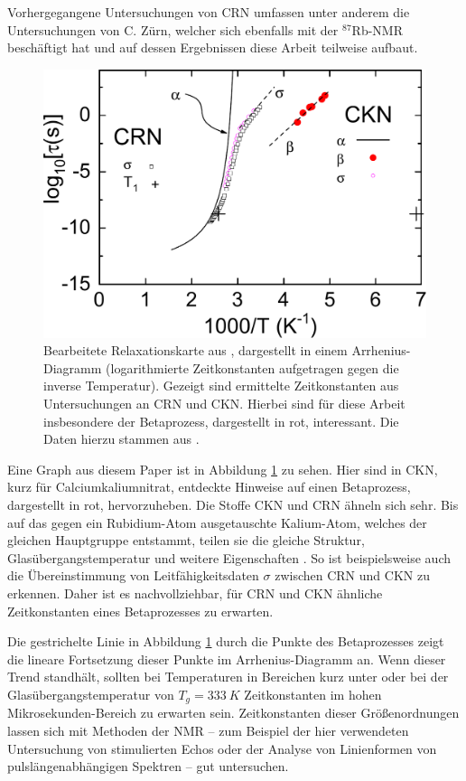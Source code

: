 Vorhergegangene Untersuchungen von CRN umfassen unter anderem die Untersuchungen von C. Zürn, welcher sich ebenfalls mit der $^\text{87}$Rb-NMR beschäftigt hat \cite{zuern_paper} und auf dessen Ergebnissen diese Arbeit teilweise aufbaut.
\begin{figure}
	\begin{center}
		\includegraphics[width=.7\textwidth]{graphics/zuern/Plot1_b2.pdf}
	\end{center}
	\caption{Bearbeitete Relaxationskarte aus \cite{zuern_paper}, dargestellt in einem Arrhenius-Diagramm (logarithmierte Zeitkonstanten aufgetragen gegen die inverse Temperatur). Gezeigt sind ermittelte Zeitkonstanten aus Untersuchungen an CRN und CKN. Hierbei sind für diese Arbeit insbesondere der Betaprozess, dargestellt in rot, interessant. Die Daten hierzu stammen aus \cite{johari_beta}.} \label{fig:einl:zuernpaper}
\end{figure}

Eine Graph aus diesem Paper ist in Abbildung \ref{fig:einl:zuernpaper} zu sehen. Hier sind in CKN, kurz für Calciumkaliumnitrat, entdeckte Hinweise auf einen Betaprozess, dargestellt in rot, hervorzuheben. Die Stoffe CKN und CRN ähneln sich sehr. Bis auf das gegen ein Rubidium-Atom ausgetauschte Kalium-Atom, welches der gleichen Hauptgruppe entstammt, teilen sie die gleiche Struktur, Glasübergangstemperatur und weitere Eigenschaften \cite{PIMENOV199793}. So ist beispielsweise auch die Übereinstimmung von Leitfähigkeitsdaten $\sigma$ zwischen CRN und CKN zu erkennen. Daher ist es nachvollziehbar, für CRN und CKN ähnliche Zeitkonstanten eines Betaprozesses zu erwarten.

Die gestrichelte Linie in Abbildung \ref{fig:einl:zuernpaper} durch die Punkte des Betaprozesses zeigt die lineare Fortsetzung dieser Punkte im Arrhenius-Diagramm an. Wenn dieser Trend standhält, sollten bei Temperaturen in Bereichen kurz unter oder bei der Glasübergangstemperatur von $T_g = \SI{333}{K}$ Zeitkonstanten im hohen Mikrosekunden-Bereich zu erwarten sein. Zeitkonstanten dieser Größenordnungen lassen sich mit Methoden der NMR -- zum Beispiel der hier verwendeten Untersuchung von stimulierten Echos oder der Analyse von Linienformen von pulslängenabhängigen Spektren -- gut untersuchen.

